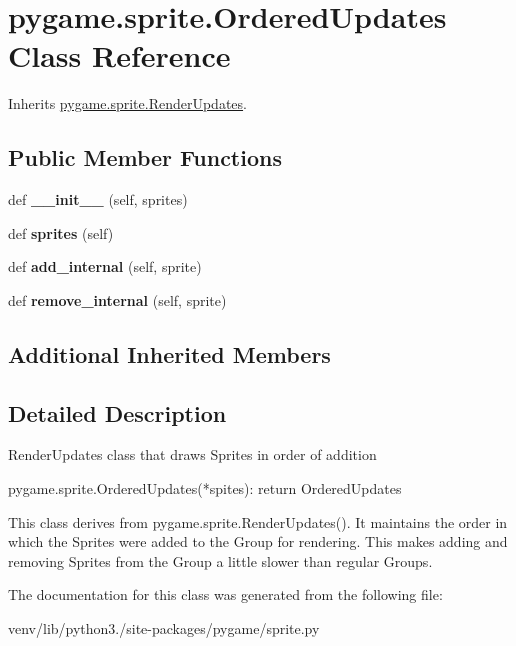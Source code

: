 \hypertarget{classpygame_1_1sprite_1_1_ordered_updates}{}\section{pygame.\+sprite.\+Ordered\+Updates Class Reference}
\label{classpygame_1_1sprite_1_1_ordered_updates}


Inherits \hyperlink{classpygame_1_1sprite_1_1_render_updates}{pygame.\+sprite.\+Render\+Updates}.

\subsection*{Public Member Functions}
\begin{DoxyCompactItemize}
\item 
\mbox{\label{classpygame_1_1sprite_1_1_ordered_updates_a050c302cc04e83775fb34ef2728a4fb3}} 
def {\bfseries \+\_\+\+\_\+init\+\_\+\+\_\+} (self, sprites)
\item 
\mbox{\label{classpygame_1_1sprite_1_1_ordered_updates_a5ce81324106e9adcbcc4c9ad66e902fe}} 
def {\bfseries sprites} (self)
\item 
\mbox{\label{classpygame_1_1sprite_1_1_ordered_updates_ad83b4c722a5de6db869314c34ba64556}} 
def {\bfseries add\+\_\+internal} (self, sprite)
\item 
\mbox{\label{classpygame_1_1sprite_1_1_ordered_updates_a341fe956e2d79bddaeb306e3dcd2fc40}} 
def {\bfseries remove\+\_\+internal} (self, sprite)
\end{DoxyCompactItemize}
\subsection*{Additional Inherited Members}


\subsection{Detailed Description}
\begin{DoxyVerb}RenderUpdates class that draws Sprites in order of addition

pygame.sprite.OrderedUpdates(*spites): return OrderedUpdates

This class derives from pygame.sprite.RenderUpdates().  It maintains
the order in which the Sprites were added to the Group for rendering.
This makes adding and removing Sprites from the Group a little
slower than regular Groups.\end{DoxyVerb}
 

The documentation for this class was generated from the following file\+:\begin{DoxyCompactItemize}
\item 
venv/lib/python3./site-\/packages/pygame/sprite.\+py\end{DoxyCompactItemize}
